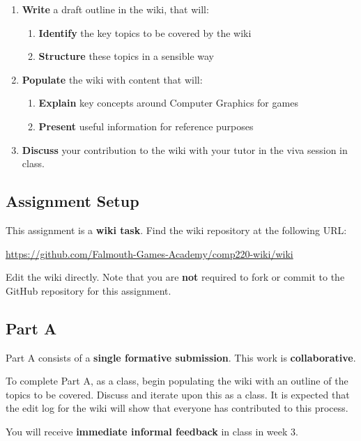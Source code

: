 \documentclass{../../fal_assignment}
\begin{document}
	\begin{enumerate}[label=(\Alph*)]
		\item \textbf{Write} a draft outline in the wiki, that will:
		\begin{enumerate}[label=(\roman*)]
			\item \textbf{Identify} the key topics to be covered by the wiki
			\item \textbf{Structure} these topics in a sensible way
		\end{enumerate}
		\item \textbf{Populate} the wiki with content that will:
		\begin{enumerate}[label=(\roman*)]
			\item \textbf{Explain} key concepts around Computer Graphics for games
			\item \textbf{Present} useful information for reference purposes
		\end{enumerate}
		\item \textbf{Discuss} your contribution to the wiki with your tutor in the viva session in class.
	\end{enumerate}
	
	\subsection*{Assignment Setup}
	
	This assignment is a \textbf{wiki task}. Find the wiki repository at the following URL:
	
	\indent \url{https://github.com/Falmouth-Games-Academy/comp220-wiki/wiki}
	
	Edit the wiki directly. Note that you are \textbf{not} required to fork or commit to the GitHub repository
	for this assignment.
	
	\subsection*{Part A}
	
	Part A consists of a \textbf{single formative submission}. This work is \textbf{collaborative}.
	
	To complete Part A, as a class, begin populating the wiki with an outline of the topics to be covered.
	Discuss and iterate upon this as a class.
	It is expected that the edit log for the wiki will show that everyone has contributed to this process.
	
	You will receive \textbf{immediate informal feedback} in class in week 3.
	
\end{document}
